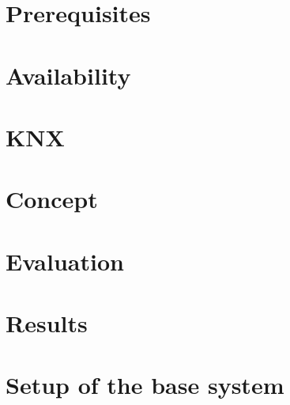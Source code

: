 \documentclass[a4paper,12pt,oneside,openright]{memoir}
\begin{document}
\chapter{Prerequisites}
\label{ch:prerequisites}




\chapter{Availability}
\label{ch:availability}



\chapter{KNX}
\label{ch:knx}






\chapter{Concept}
\label{ch:concept}



\chapter{Evaluation}
\label{ch:implementation}



\chapter{Results}
\label{ch:conclusion}




\appendix

\nocite{*}	%

\chapter{Setup of the base system}
\label{ch:basesystem}


\printglossary
\printbibliography
\end{document}
